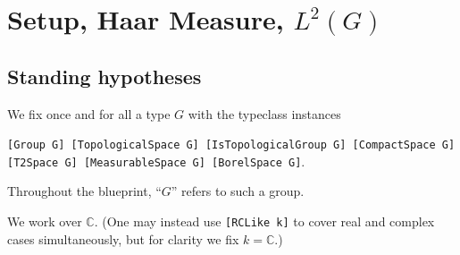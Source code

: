 %
%
%
%
%

\chapter{Setup, Haar Measure, $L^2(G)$}
\label{chap:setup}

\section{Standing hypotheses}

\begin{definition}
  \label{def:G}
  \mathlibok
  We fix once and for all a type $G$ with the typeclass instances
  \begin{center}
    \texttt{[Group G] [TopologicalSpace G] [IsTopologicalGroup G]
      [CompactSpace G] [T2Space G] [MeasurableSpace G] [BorelSpace G]}.
  \end{center}
  Throughout the blueprint, ``$G$'' refers to such a group.
\end{definition}

\begin{definition}
  \label{def:scalars}
  \mathlibok
  We work over $\mathbb C$. (One may instead use \texttt{[RCLike k]}
  to cover real and complex cases simultaneously, but for clarity we
  fix $k = \mathbb C$.)
\end{definition}

